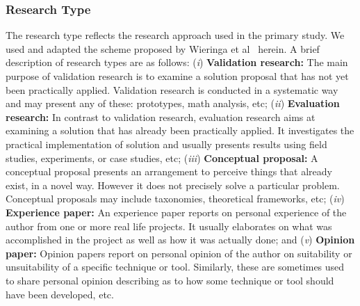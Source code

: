 




\subsubsection{Research Type}\label{research_type}

The research type reflects the research approach used in the primary study. We used and adapted the scheme proposed by Wieringa et al~\cite{Wieringa:2005:REP:1107677.1107683} herein. A brief description of research types are as follows: (\textit{i}) \textbf{Validation research:} The main purpose of validation research is to examine a solution proposal that has not yet been practically applied. Validation research is conducted in a systematic way and may present any of these: prototypes, math analysis, etc; (\textit{ii}) \textbf{Evaluation research:} In contrast to validation research, evaluation research aims at examining a solution that has already been practically applied. It investigates the practical implementation of solution and usually presents results using field studies, experiments, or case studies, etc; (\textit{iii}) \textbf{Conceptual proposal:} A conceptual proposal presents an arrangement to perceive things that already exist, in a novel way. However it does not precisely solve a particular problem. Conceptual proposals may include taxonomies, theoretical frameworks, etc; (\textit{iv}) \textbf{Experience paper:} An experience paper reports on personal experience of the author from one or more real life projects. It usually elaborates on what was accomplished in the project as well as how it was actually done; and (\textit{v}) \textbf{Opinion paper:} Opinion papers report on personal opinion of the author on suitability or unsuitability of a specific technique or tool. Similarly, these are sometimes used to share personal opinion describing as to how some technique or tool should have been developed, etc.

